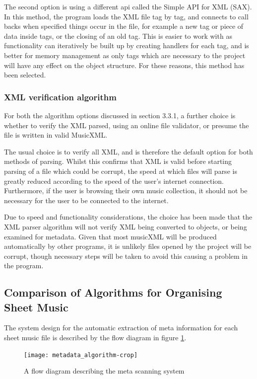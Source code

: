 The second option is using a different api called the Simple API for XML (SAX). In this method, the program loads the XML file tag by tag, and connects to call backs when specified things occur in the file, for example a new tag or piece of data inside tags, or the closing of an old tag. This is easier to work with as functionality can iteratively be built up by creating handlers for each tag, and is better for memory management as only tags which are necessary to the project will have any effect on the object structure. For these reasons, this method has been selected.

\subsubsection{XML verification algorithm}
For both the algorithm options discussed in section 3.3.1, a further choice is whether to verify the XML parsed, using an online file validator, or presume the file is written in valid MusicXML. 

The usual choice is to verify all XML, and is therefore the default option for both methods of parsing. Whilst this confirms that XML is valid before starting parsing of a file which could be corrupt, the speed at which files will parse is greatly reduced according to the speed of the user's internet connection.
Furthermore, if the user is browsing their own music collection, it should not be necessary for the user to be connected to the internet.

Due to speed and functionality considerations, the choice has been made that the XML parser algorithm will not verify XML being converted to objects, or being examined for metadata. Given that most musicXML will be produced automatically by other programs, it is unlikely files opened by the project will be corrupt, though necessary steps will be taken to avoid this causing a problem in the program.

\subsection{Comparison of Algorithms for Organising Sheet Music}
The system design for the automatic extraction of meta information for each sheet music file is described by the flow diagram in figure \ref{fig:meta}. 
\begin{figure}[H]
    \centering
    \texttt{[image: metadata\_algorithm-crop]}
    \caption{A flow diagram describing the meta scanning system}
    \label{fig:meta}
\end{figure}

